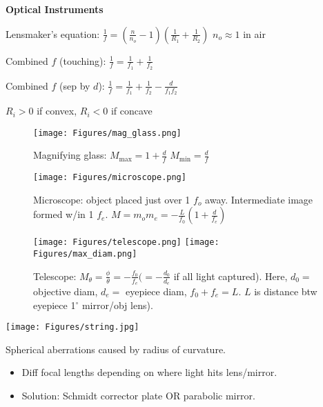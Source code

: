 \documentclass[twocolumn]{article}
\begin{document}
\dotfill

\textbf{Optical Instruments}

Lensmaker's equation: $\frac{1}{f} = \left( \frac{n}{n_o}-1 \right) \left( \frac{1}{R_1} + \frac{1}{R_2} \right)$ \hfill $n_o \approx 1$ in air

Combined $f$ (touching): $\frac{1}{f} = \frac{1}{f_1} + \frac{1}{f_2}$

Combined $f$ (sep by $d$): $\frac{1}{f} = \frac{1}{f_1} + \frac{1}{f_2} - \frac{d}{f_1 f_2}$

$R_i > 0$ if convex, $R_i < 0$ if concave

\begin{figure}[h!]
    \centering
    \texttt{[image: Figures/mag\_glass.png]}
    \caption{Magnifying glass: $M_{\text{max}} = 1 + \frac{d}{f}$ \hspace{2em} $M_{\text{min}} = \frac{d}{f}$}
\end{figure}

\begin{figure}[h!]
    \centering
    \texttt{[image: Figures/microscope.png]}
    \caption{Microscope: object placed just over 1 $f_o$ away. Intermediate image formed w/in 1 $f_e$. \hfill $M = m_o m_e = -\frac{L}{f_0} \left( 1 + \frac{d}{f_e} \right)$}
\end{figure}

\begin{figure}[h!]
    \centering
    \texttt{[image: Figures/telescope.png]} \hfill \texttt{[image: Figures/max\_diam.png]}
    \caption{Telescope: $M_\theta = \frac{\phi}{\theta} = -\frac{f_0}{f_e} (= -\frac{d_0}{d_e}$ if all light captured). Here, $d_0 = $ objective diam, $d_e =$ eyepiece diam, $f_0 + f_e = L$. $L$ is distance btw eyepiece 1$^\circ$ mirror/obj lens).}
\end{figure}



\clearpage

\centering \texttt{[image: Figures/string.jpg]} \flushleft \vspace{-1.5em}

\dotfill

Spherical aberrations caused by radius of curvature. \vspace{-.5em}
\begin{itemize}
    \item Diff focal lengths depending on where light hits lens/mirror.
    \item Solution: Schmidt corrector plate OR parabolic mirror.
\end{itemize}
\end{document}
